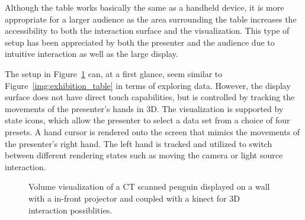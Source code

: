 \documentclass[journal]{vgtc}                %
\begin{document}
Although the table works basically the same as a handheld device, it is more appropriate for a larger audience as the area surrounding the table increases the accessibility to both the interaction surface and the visualization.
This type of setup has been appreciated by both the presenter and the audience due to intuitive interaction as well as the large display.


The setup in Figure~\ref{img:exhibition_kinect} can, at a first glance, seem similar to Figure~\ref{img:exhibition_table} in terms of exploring data.
However, the display surface does not have direct touch capabilities, but is controlled by tracking the movements of the presenter's hands in 3D.
The visualization is supported by state icons, which allow the presenter to select a data set from a choice of four presets.
A hand cursor is rendered onto the screen that mimics the movements of the presenter's right hand.
The left hand is tracked and utilized to switch between different rendering states such as moving the camera or light source interaction.

\begin{figure}[tb]
	\centering
	\caption{Volume visualization of a CT scanned penguin displayed on a wall with a in-front projector and coupled with a kinect for 3D interaction possiblities.}
	\label{img:exhibition_kinect}
\end{figure}
\end{document}
